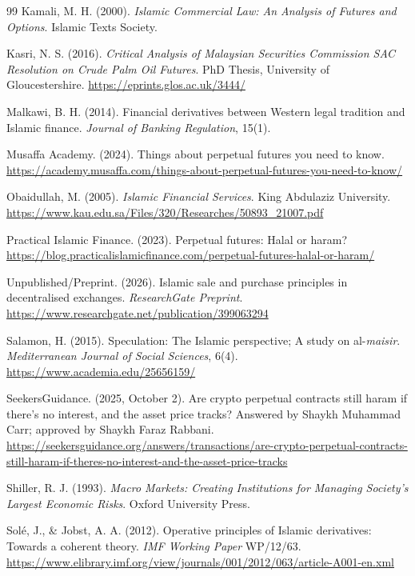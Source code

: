 \documentclass[10pt,twocolumn]{article}
\begin{document}
\begin{thebibliography}{99}
Kamali, M. H. (2000).
\textit{Islamic Commercial Law: An Analysis of Futures and Options}.
Islamic Texts Society.

Kasri, N. S. (2016).
\textit{Critical Analysis of Malaysian Securities Commission SAC Resolution on
Crude Palm Oil Futures}.
PhD Thesis, University of Gloucestershire.
\url{https://eprints.glos.ac.uk/3444/}

Malkawi, B. H. (2014).
Financial derivatives between Western legal tradition and Islamic finance.
\textit{Journal of Banking Regulation}, 15(1).

Musaffa Academy. (2024).
Things about perpetual futures you need to know.
\url{https://academy.musaffa.com/things-about-perpetual-futures-you-need-to-know/}

Obaidullah, M. (2005).
\textit{Islamic Financial Services}.
King Abdulaziz University.
\url{https://www.kau.edu.sa/Files/320/Researches/50893_21007.pdf}

Practical Islamic Finance. (2023).
Perpetual futures: Halal or haram?
\url{https://blog.practicalislamicfinance.com/perpetual-futures-halal-or-haram/}

Unpublished/Preprint. (2026).
Islamic sale and purchase principles in decentralised exchanges.
\textit{ResearchGate Preprint}.
\url{https://www.researchgate.net/publication/399063294}

Salamon, H. (2015).
Speculation: The Islamic perspective; A study on al-\textit{maisir}.
\textit{Mediterranean Journal of Social Sciences}, 6(4).
\url{https://www.academia.edu/25656159/}

SeekersGuidance. (2025, October 2).
Are crypto perpetual contracts still haram if there's no interest, and the
asset price tracks?
Answered by Shaykh Muhammad Carr; approved by Shaykh Faraz Rabbani.
\url{https://seekersguidance.org/answers/transactions/are-crypto-perpetual-contracts-still-haram-if-theres-no-interest-and-the-asset-price-tracks}

Shiller, R. J. (1993).
\textit{Macro Markets: Creating Institutions for Managing Society's Largest
Economic Risks}.
Oxford University Press.

Sol\'{e}, J., \& Jobst, A. A. (2012).
Operative principles of Islamic derivatives: Towards a coherent theory.
\textit{IMF Working Paper} WP/12/63.
\url{https://www.elibrary.imf.org/view/journals/001/2012/063/article-A001-en.xml}


\end{thebibliography}
\end{document}
